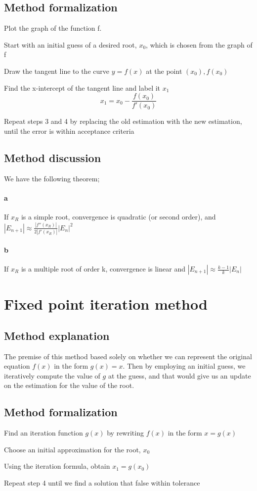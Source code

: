 \documentclass[openany]{book}
\begin{document}
    \subsection{Method formalization}
    \begin{steps}
    	\item Plot the graph of the function f.
        \item Start with an initial guess of a desired root, ${x_0}$, which is chosen from the graph of f
        \item Draw the tangent line to the curve ${y =f(x)}$ at the point ${(x_0), f(x_0)}$
        \item Find the x-intercept of the tangent line and label it ${x_1}$
        \[x_1 = x_0 - \frac{f(x_0)}{f'(x_0)}\]
        \item Repeat steps 3 and 4 by replacing the old estimation with the new estimation, until the error is within acceptance criteria
    \end{steps}
    \subsection{Method discussion}
    We have the following theorem;
    \paragraph{a} If ${x_R}$ is a simple root, convergence is quadratic (or second order), and ${|E_{n+1}| \approx \frac{|f''(x_R)|}{2|f'(x_R)|}|E_n|^2}$
    \paragraph{b} If ${x_R}$ is a multiple root of order k, convergence is linear and  ${|E_{n+1}| \approx \frac{k-1}{k}|E_n|}$
    \section{Fixed point iteration method}
    \subsection{Method explanation}
    The premise of this method based solely on whether we can represent the original equation ${f(x)}$ in the form ${g(x) = x}$. Then by employing an initial guess, we iteratively compute the value of ${g}$ at the guess, and that would give us an update on the estimation for the value of the root.
    \subsection{Method formalization}
    \begin{steps}
    	\item Find an iteration function ${g(x)}$ by rewriting ${f(x)}$ in the form ${x = g(x)}$
        \item Choose an initial approximation for the root, ${x_0}$
        \item Using the iteration formula, obtain ${x_1 = g(x_0)}$
        \item Repeat step 4 until we find a solution that false within tolerance
    \end{steps}
\end{document}
